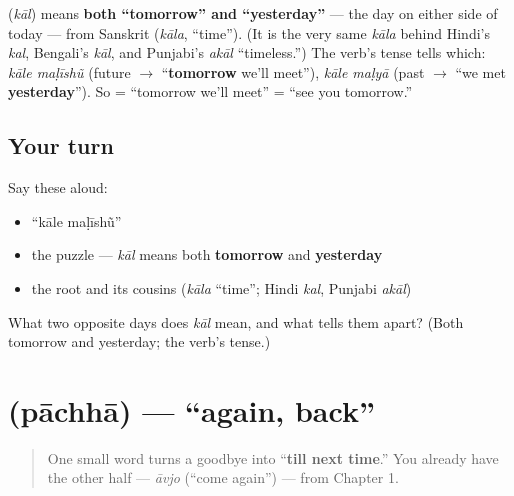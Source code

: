 \begin{cousinweb}
\textbf{} (\emph{kāl}) means \textbf{both \textquotedblleft{}tomorrow\textquotedblright{} and \textquotedblleft{}yesterday\textquotedblright{}} — the day on either side of today — from Sanskrit \textbf{} (\emph{kāla}, \textquotedblleft{}time\textquotedblright{}). (It is the very same \emph{kāla} behind Hindi's \emph{kal}, Bengali's \emph{kāl}, and Punjabi's \emph{akāl} \textquotedblleft{}timeless.\textquotedblright{}) The verb's tense tells which: \emph{kāle maḷīshũ} (future $\to$ \textquotedblleft{}\textbf{tomorrow} we'll meet\textquotedblright{}), \emph{kāle maḷyā} (past $\to$ \textquotedblleft{}we met \textbf{yesterday}\textquotedblright{}). So \textbf{ } = \textquotedblleft{}tomorrow we'll meet\textquotedblright{} = \textquotedblleft{}see you tomorrow.\textquotedblright{}
\end{cousinweb}

\subsection*{Your turn}
Say these aloud:

\begin{itemize}
\raggedright
  \item \textquotedblleft{}kāle maḷīshũ\textquotedblright{}
  \item the puzzle — \emph{kāl} means both \textbf{tomorrow} and \textbf{yesterday}
  \item the root and its cousins (\emph{kāla} \textquotedblleft{}time\textquotedblright{}; Hindi \emph{kal}, Punjabi \emph{akāl})
\end{itemize}

\begin{tcolorbox}[breakable,colback=teal!4,colframe=teal!35!black,title={Before you move on}]
What two opposite days does \emph{kāl} mean, and what tells them apart? (Both tomorrow and yesterday; the verb's tense.)
\end{tcolorbox}
\section[\gu{પાછા}]{ (pāchhā) — \textquotedblleft{}again, back\textquotedblright{}}

\label{lesson:GU-C04-pachha}



\begin{quote}
One small word turns a goodbye into \textquotedblleft{}\textbf{till next time}.\textquotedblright{} You already have the other half — \emph{āvjo} (\textquotedblleft{}come again\textquotedblright{}) — from Chapter 1.
\end{quote}

